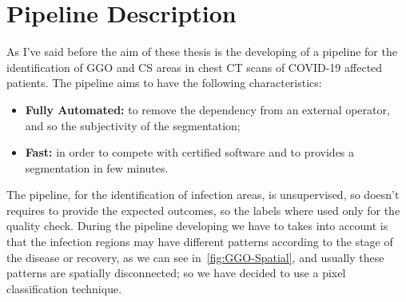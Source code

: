 
	
	\section{Pipeline Description}
	
	As I've said before the aim of these thesis is the developing of a pipeline for the identification of GGO and CS areas in chest CT scans of COVID-19 affected patients. The pipeline aims to have the following characteristics:   
	\begin{itemize}
		\item  \textbf{Fully Automated: } to remove the dependency from an external operator, and so the subjectivity of the segmentation; 
		
		\item \textbf{Fast: } in order to compete with certified software and to provides a segmentation in few minutes.
	\end{itemize}

	The pipeline, for the identification of infection areas, is unsupervised, so doesn't requires to provide the expected outcomes, so the labels where used only for the quality check. During the pipeline developing we have to takes into account is that the infection regions may have different patterns according to the stage of the disease or recovery, as we can see in \figurename\,\ref{fig:GGO-Spatial}, and usually these patterns are spatially disconnected; so we have decided to use a pixel classification technique. %
	
	
